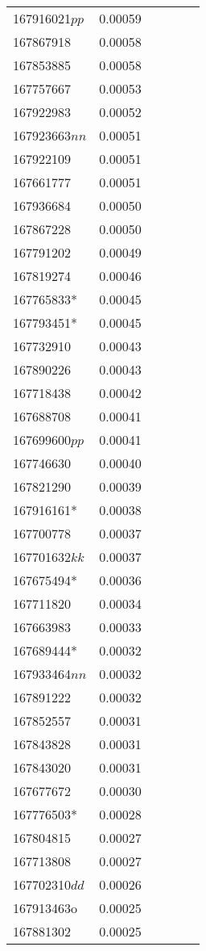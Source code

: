 \begin{landscape}
\begin{longtable}{p{1.6cm}p{1.2cm}p{1.5cm}p{1.5cm}p{2.8cm}p{13.5cm}}
167916021$pp$&0.00059&&&& \\
167867918&0.00058&&&& \\
167853885&0.00058&&&& \\
167757667&0.00053&&&& \\
167922983&0.00052&&&& \\
167923663$nn$&0.00051&&&& \\
167922109&0.00051&&&& \\
167661777&0.00051&&&& \\
167936684&0.00050&&&& \\
167867228&0.00050&&&& \\
167791202&0.00049&&&& \\
167819274&0.00046&&&& \\
167765833*&0.00045&&&& \\
167793451*&0.00045&&&& \\
167732910&0.00043&&&& \\
167890226&0.00043&&&& \\
167718438&0.00042&&&& \\
167688708&0.00041&&&& \\
167699600$pp$&0.00041&&&& \\
167746630&0.00040&&&& \\
167821290&0.00039&&&& \\
167916161*&0.00038&&&& \\
167700778&0.00037&&&& \\
167701632$kk$&0.00037&&&& \\
167675494*&0.00036&&&& \\
167711820&0.00034&&&& \\
167663983&0.00033&&&& \\
167689444*&0.00032&&&& \\
167933464$nn$&0.00032&&&& \\
167891222&0.00032&&&& \\
167852557&0.00031&&&& \\
167843828&0.00031&&&& \\
167843020&0.00031&&&& \\
167677672&0.00030&&&& \\
167776503*&0.00028&&&& \\
167804815&0.00027&&&& \\
167713808&0.00027&&&& \\
167702310$dd$&0.00026&&&& \\
167913463o&0.00025&&&& \\
167881302&0.00025&&&& \\

\end{longtable}
\end{landscape}

